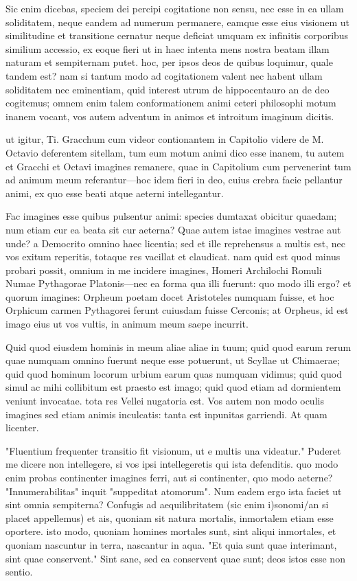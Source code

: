  Sic enim dicebas, speciem dei percipi cogitatione non sensu, nec esse in ea ullam soliditatem, neque eandem ad numerum permanere, eamque esse eius visionem ut similitudine et transitione cernatur neque deficiat umquam ex infinitis corporibus similium accessio, ex eoque fieri ut in haec intenta mens nostra beatam illam naturam et sempiternam putet. hoc, per ipsos deos de quibus loquimur, quale tandem est? nam si tantum modo ad cogitationem valent nec habent ullam soliditatem nec eminentiam, quid interest utrum de hippocentauro an de deo cogitemus; omnem enim talem conformationem animi ceteri philosophi motum inanem vocant, vos autem adventum in animos et introitum imaginum dicitis.

 ut igitur, Ti. Gracchum cum videor contionantem in Capitolio videre de M. Octavio deferentem sitellam, tum eum motum animi dico esse inanem, tu autem et Gracchi et Octavi imagines remanere, quae in Capitolium cum pervenerint tum ad animum meum referantur—hoc idem fieri in deo, cuius crebra facie pellantur animi, ex quo esse beati atque aeterni intellegantur.

 Fac imagines esse quibus pulsentur animi: species dumtaxat obicitur quaedam; num etiam cur ea beata sit cur aeterna? Quae autem istae imagines vestrae aut unde? a Democrito omnino haec licentia; sed et ille reprehensus a multis est, nec vos exitum reperitis, totaque res vacillat et claudicat. nam quid est quod minus probari possit, omnium in me incidere imagines, Homeri Archilochi Romuli Numae Pythagorae Platonis—nec ea forma qua illi fuerunt: quo modo illi ergo? et quorum imagines: Orpheum poetam docet Aristoteles numquam fuisse, et hoc Orphicum carmen Pythagorei ferunt cuiusdam fuisse Cerconis; at Orpheus, id est imago eius ut vos vultis, in animum meum saepe incurrit.

 Quid quod eiusdem hominis in meum aliae aliae in tuum; quid quod earum rerum quae numquam omnino fuerunt neque esse potuerunt, ut Scyllae ut Chimaerae; quid quod hominum locorum urbium earum quas numquam vidimus; quid quod simul ac mihi collibitum est praesto est imago; quid quod etiam ad dormientem veniunt invocatae. tota res Vellei nugatoria est. Vos autem non modo oculis imagines sed etiam animis inculcatis: tanta est inpunitas garriendi. At quam licenter.

 "Fluentium frequenter transitio fit visionum, ut e multis una videatur." Puderet me dicere non intellegere, si vos ipsi intellegeretis qui ista defenditis. quo modo enim probas continenter imagines ferri, aut si continenter, quo modo aeterne? "Innumerabilitas" inquit "suppeditat atomorum". Num eadem ergo ista faciet ut sint omnia sempiterna? Confugis ad aequilibritatem (sic enim i)sonomi/an si placet appellemus) et ais, quoniam sit natura mortalis, inmortalem etiam esse oportere. isto modo, quoniam homines mortales sunt, sint aliqui inmortales, et quoniam nascuntur in terra, nascantur in aqua. "Et quia sunt quae interimant, sint quae conservent." Sint sane, sed ea conservent quae sunt; deos istos esse non sentio.

